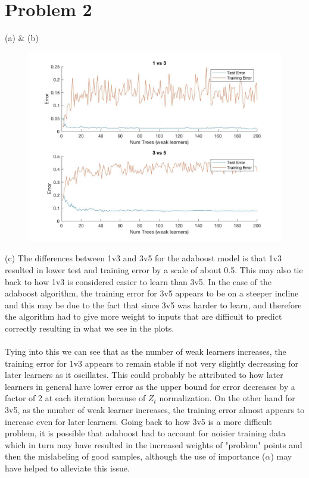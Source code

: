 \documentclass[12pt,letterpaper]{article}
\begin{document}
\section*{Problem 2}
\begin{description}
	\item (a) \& (b)
\begin{figure}[H]
\includegraphics[scale=0.4]{image2.jpg} 
\end{figure}
\item (c) The differences between 1v3 and 3v5 for the adaboost model is that 1v3 resulted in lower test and training error by a scale of about 0.5.  This may also tie back to how 1v3 is considered easier to learn than 3v5. In the case of the adaboost algorithm, the training error for 3v5 appears to be on a steeper incline and this may be due to the fact that since 3v5 was harder to learn, and therefore the algorithm had to give more weight to inputs that are difficult to predict correctly resulting in what we see in the plots. 
\\\\Tying into this we can see that as the number of weak learners increases, the training error for 1v3 appears to remain stable if not very slightly decreasing for later learners as it oscillates. This could probably be attributed to how later learners in general have lower error as the upper bound for error decreases by a factor of 2 at each iteration because of $Z_t$ normalization. On the other hand for 3v5, as the number of weak learner increases, the training error almost appears to increase even for later learners. Going back to how 3v5 is a more difficult problem, it is possible that adaboost had to account for noisier training data which in turn may have resulted in the increased weights of "problem" points and then the mislabeling of good samples, although the use of importance ($\alpha$) may have helped to alleviate this issue.

\end{description}
\end{document}
